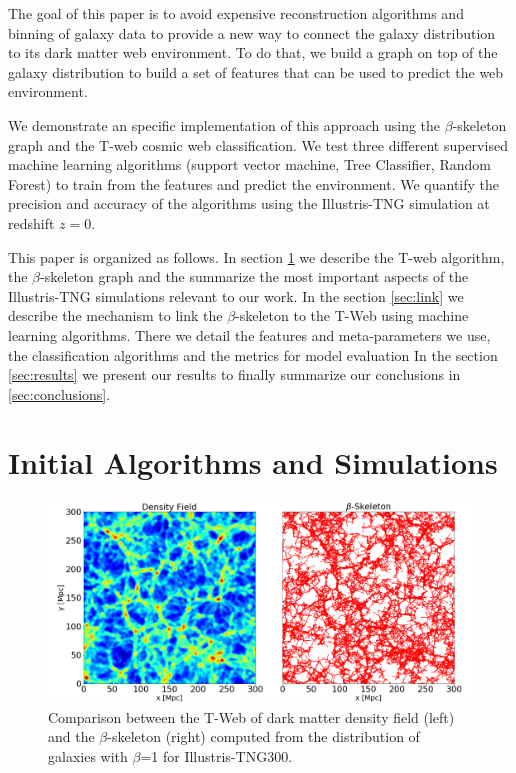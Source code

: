 \documentclass[usenatbib]{mnras}
\begin{document}
The goal of this paper is to avoid expensive reconstruction algorithms
and binning of galaxy data to provide a new way to connect the galaxy
distribution to its dark matter web environment.
To do that, we build a graph on top of the galaxy distribution 
to build a set of features that can be used to predict the web
environment.

We demonstrate an specific implementation of this approach using 
the $\beta$-skeleton graph \citep{Fang2019} and the 
T-web \citep{Forero-Romero2009} cosmic web classification.
We test three different supervised machine learning
algorithms (support vector machine, Tree Classifier, Random Forest) 
to train from the features and predict the environment.
We quantify the precision and accuracy of the algorithms using 
the Illustris-TNG simulation \citep{Nelson2015} at redshift $z=0$.

This paper is organized as follows. 
In section \ref{sec:init} we describe the T-web algorithm,
the $\beta$-skeleton graph and the summarize the most important
aspects of the Illustris-TNG simulations relevant to our work.
In the section \ref{sec:link} we
describe the mechanism to link the $\beta$-skeleton to the T-Web
using machine learning algorithms. 
There we detail the features and meta-parameters we use, the
classification algorithms and the metrics for model evaluation 
In the section \ref{sec:results} we present our results
to finally summarize our conclusions in \ref{sec:conclusions}.


\section{Initial Algorithms and Simulations}\label{sec:init}

\begin{figure}
\centering
 \includegraphics[scale=0.3]{Figs/Fig1_.png}
 \caption{Comparison between the T-Web of dark matter density field (left) and the $\beta$-skeleton (right) computed from the distribution of galaxies with $\beta$=1 for Illustris-TNG300.}
 \label{fig:Fig1}
\end{figure}
\end{document}

